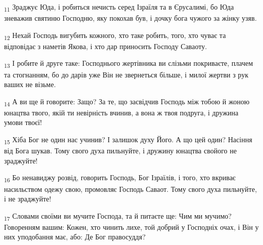\begin{tcolorbox}
\textsubscript{11} Зраджує Юда, і робиться нечисть серед Ізраїля та в Єрусалимі, бо Юда зневажив святиню Господню, яку покохав був, і дочку бога чужого за жінку узяв.
\end{tcolorbox}
\begin{tcolorbox}
\textsubscript{12} Нехай Господь вигубить кожного, хто таке робить, того, хто чуває та відповідає з наметів Якова, і хто дар приносить Господу Саваоту.
\end{tcolorbox}
\begin{tcolorbox}
\textsubscript{13} І робите й друге таке: Господнього жертівника ви слізьми покриваєте, плачем та стогнанням, бо до дарів уже Він не звернеться більше, і милої жертви з рук ваших не візьме.
\end{tcolorbox}
\begin{tcolorbox}
\textsubscript{14} А ви ще й говорите: Защо? За те, що засвідчив Господь між тобою й жоною юнацтва твого, якій ти невірність вчинив, а вона ж твоя подруга, і дружина умови твоєї!
\end{tcolorbox}
\begin{tcolorbox}
\textsubscript{15} Хіба Бог не один нас учинив? І залишок духу Його. А що цей один? Насіння від Бога шукав. Тому свого духа пильнуйте, і дружину юнацтва свойого не зраджуйте!
\end{tcolorbox}
\begin{tcolorbox}
\textsubscript{16} Бо ненавиджу розвід, говорить Господь, Бог Ізраїлів, і того, хто вкриває насильством одежу свою, промовляє Господь Саваот. Тому свого духа пильнуйте, і не зраджуйте!
\end{tcolorbox}
\begin{tcolorbox}
\textsubscript{17} Словами своїми ви мучите Господа, та й питаєте ще: Чим ми мучимо? Говоренням вашим: Кожен, хто чинить лихе, той добрий у Господніх очах, і Він у них уподобання має, або: Де Бог правосуддя?
\end{tcolorbox}
